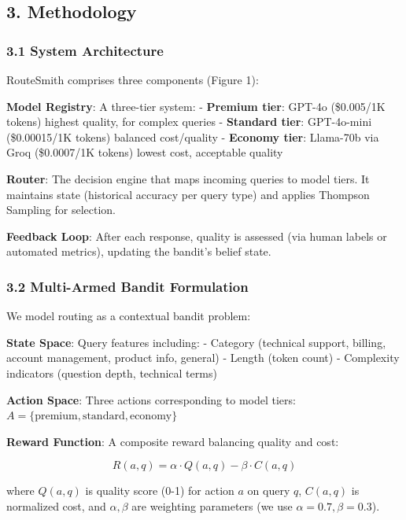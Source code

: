 \hypertarget{methodology}{%
\subsection{3. Methodology}\label{methodology}}

\hypertarget{system-architecture}{%
\subsubsection{3.1 System Architecture}\label{system-architecture}}

RouteSmith comprises three components (Figure 1):

\textbf{Model Registry}: A three-tier system: - \textbf{Premium tier}:
GPT-4o (\$0.005/1K tokens) highest quality, for complex queries -
\textbf{Standard tier}: GPT-4o-mini (\$0.00015/1K tokens) balanced
cost/quality - \textbf{Economy tier}: Llama-70b via Groq (\$0.0007/1K
tokens) lowest cost, acceptable quality

\textbf{Router}: The decision engine that maps incoming queries to model
tiers. It maintains state (historical accuracy per query type) and
applies Thompson Sampling for selection.

\textbf{Feedback Loop}: After each response, quality is assessed (via
human labels or automated metrics), updating the bandit's belief state.

\hypertarget{multi-armed-bandit-formulation}{%
\subsubsection{3.2 Multi-Armed Bandit
Formulation}\label{multi-armed-bandit-formulation}}

We model routing as a contextual bandit problem:

\textbf{State Space}: Query features including: - Category (technical
support, billing, account management, product info, general) - Length
(token count) - Complexity indicators (question depth, technical terms)

\textbf{Action Space}: Three actions corresponding to model tiers:
\(A = \{\text{premium}, \text{standard}, \text{economy}\}\)

\textbf{Reward Function}: A composite reward balancing quality and cost:

\[R(a, q) = \alpha \cdot Q(a, q) - \beta \cdot C(a, q)\]

where \(Q(a,q)\) is quality score (0-1) for action \(a\) on query \(q\),
\(C(a,q)\) is normalized cost, and \(\alpha, \beta\) are weighting
parameters (we use \(\alpha=0.7, \beta=0.3\)).

